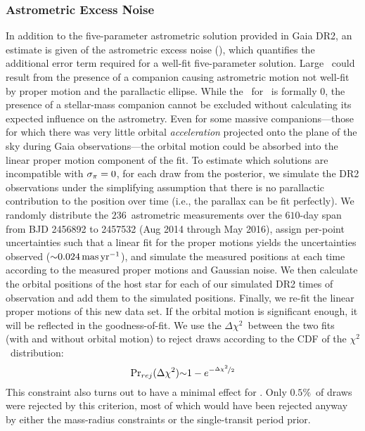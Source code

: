\documentclass[twocolumn]{aastex63}
\begin{document}
\subsubsection{Astrometric Excess Noise}


In addition to the five-parameter astrometric solution provided in Gaia DR2, an estimate is given of the astrometric excess noise (\aen), which quantifies the additional error term required for a well-fit five-parameter solution. Large \aen\ could result from the presence of a companion causing astrometric motion not well-fit by proper motion and the parallactic ellipse. While the \aen\ for \thisstar\ is formally 0, the presence of a stellar-mass companion cannot be excluded without calculating its expected influence on the astrometry. Even for some massive companions---those for which there was very little orbital {\it acceleration} projected onto the plane of the sky during Gaia observations---the orbital motion could be absorbed into the linear proper motion component of the fit. 
To estimate which solutions are incompatible with $\aen = 0$, for each draw from the posterior, we simulate the DR2 observations under the simplifying assumption that there is no parallactic contribution to the position over time (i.e., the parallax can be fit perfectly). We randomly distribute the $236$\ astrometric measurements over the $610$-day span from BJD 2456892 to 2457532 (Aug 2014 through May 2016), assign per-point uncertainties such that a linear fit for the proper motions yields the uncertainties observed ($\mathord{\sim} 0.024\,{\rm mas\,yr}^{-1}$), and simulate the measured positions at each time according to the measured proper motions and Gaussian noise. We then calculate the orbital positions of the host star for each of our simulated DR2 times of observation and add them to the simulated positions. Finally, we re-fit the linear proper motions of this new data set. If the orbital motion is significant enough, it will be reflected in the goodness-of-fit. We use the $\Delta\chi^2$\ between the two fits (with and without orbital motion) to reject draws according to the CDF of the $\chi^2$\ distribution: 
\begin{equation}
    {\Pr}_{rej}(\Delta\chi^2) \mathord{\sim} 1 - e^{-\nicefrac{\Delta\chi^2}{2}}
\end{equation}
\noindent This constraint also turns out to have a minimal effect for \thisstar. Only $0.5\%$\ of draws were rejected by this criterion, most of which would have been rejected anyway by either the mass-radius constraints or the single-transit period prior.
\end{document}
